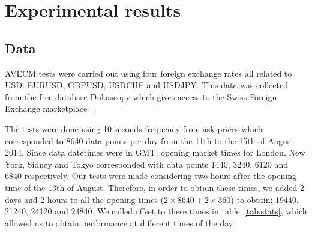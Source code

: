 %
%
%
%
%
%
\section{Experimental results}
\label{sec:results}
\subsection{Data} \label{sec:unitroot}
AVECM tests were carried out using four foreign exchange rates all related to
USD: EURUSD, GBPUSD, USDCHF and USDJPY. This data was collected from the free
database Dukascopy which gives access to the Swiss Foreign Exchange marketplace
~\cite{Dukascopy2014}.

The tests were done using 10-seconds frequency from ask prices which
corresponded to 8640 data points per day from the 11th to the 15th of August
2014. Since data datetimes were in GMT, opening market times for London, New
York, Sidney and Tokyo corresponded with data points 1440, 3240, 6120 and 6840
respectively. Our tests were made considering two hours after the opening time
of the 13th of August. Therefore, in order to obtain these times, we added 2
days and 2 hours to all the opening times ($2\times 8640 + 2 \times 360$) to obtain:
19440, 21240, 24120 and 24840. We called offset to these times in
table~\ref{tab:stats}, which allowed us to obtain performance at different
times of the day.

